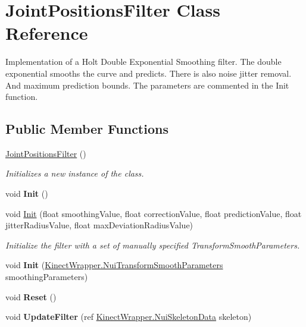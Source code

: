 \hypertarget{class_joint_positions_filter}{}\section{Joint\+Positions\+Filter Class Reference}
\label{class_joint_positions_filter}


Implementation of a Holt Double Exponential Smoothing filter. The double exponential smooths the curve and predicts. There is also noise jitter removal. And maximum prediction bounds. The parameters are commented in the Init function.  


\subsection*{Public Member Functions}
\begin{DoxyCompactItemize}
\item 
\mbox{\label{class_joint_positions_filter_aab7201ee120c14aec70402cc6a7ac1f9}} 
\mbox{\hyperlink{class_joint_positions_filter_aab7201ee120c14aec70402cc6a7ac1f9}{Joint\+Positions\+Filter}} ()
\begin{DoxyCompactList}\small\item\em Initializes a new instance of the class. \end{DoxyCompactList}\item 
\mbox{\label{class_joint_positions_filter_a15e0a5e5df56f73100e78bc7f9b9274e}} 
void {\bfseries Init} ()
\item 
void \mbox{\hyperlink{class_joint_positions_filter_a3815ebb632cddd00240f03a8ba0b429a}{Init}} (float smoothing\+Value, float correction\+Value, float prediction\+Value, float jitter\+Radius\+Value, float max\+Deviation\+Radius\+Value)
\begin{DoxyCompactList}\small\item\em Initialize the filter with a set of manually specified Transform\+Smooth\+Parameters. \end{DoxyCompactList}\item 
\mbox{\label{class_joint_positions_filter_a5ed2fce9405fbd1231bfb184400a448e}} 
void {\bfseries Init} (\mbox{\hyperlink{struct_kinect_wrapper_1_1_nui_transform_smooth_parameters}{Kinect\+Wrapper.\+Nui\+Transform\+Smooth\+Parameters}} smoothing\+Parameters)
\item 
\mbox{\label{class_joint_positions_filter_a25feb954527213cd0b28d803001f29ce}} 
void {\bfseries Reset} ()
\item 
\mbox{\label{class_joint_positions_filter_abdef3ba9b7efe903f10c4ba628e674ed}} 
void {\bfseries Update\+Filter} (ref \mbox{\hyperlink{struct_kinect_wrapper_1_1_nui_skeleton_data}{Kinect\+Wrapper.\+Nui\+Skeleton\+Data}} skeleton)
\end{DoxyCompactItemize}
